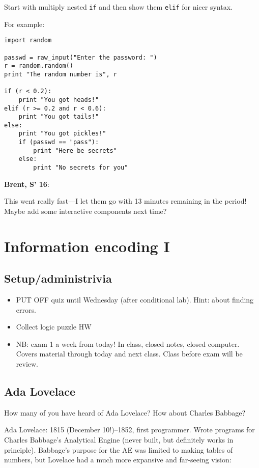\documentclass{article}
\newenvironment{reflect}[1]
{
  \begin{lrbox}{\reflectbox}
    \begin{minipage}[t]{\textwidth}
      \textbf{#1}:
}{
    \end{minipage}
  \end{lrbox}
  \fbox{\usebox{\reflectbox}}
}
\begin{document}
Start with multiply nested {\tt if} and then show them {\tt elif} for
nicer syntax.

For example:
\begin{verbatim}
import random

passwd = raw_input("Enter the password: ")
r = random.random()
print "The random number is", r

if (r < 0.2):
    print "You got heads!"
elif (r >= 0.2 and r < 0.6):
    print "You got tails!"
else:
    print "You got pickles!"
    if (passwd == "pass"):
        print "Here be secrets"
    else:
        print "No secrets for you"
\end{verbatim}

\begin{reflect}{Brent, S' 16}
  This went really fast---I let them go with 13 minutes remaining in
  the period!  Maybe add some interactive components next time?
\end{reflect}


\newpage

\section{Information encoding I}

\subsection*{Setup/administrivia}

\begin{itemize}
\item PUT OFF quiz until Wednesday (after conditional lab).  Hint:
  about finding errors.
\item Collect logic puzzle HW
\item NB: exam 1 a week from today!  In class, closed notes, closed
  computer.  Covers material through today and next class. Class
  before exam will be review.
\end{itemize}

\subsection*{Ada Lovelace}

How many of you have heard of Ada Lovelace?  How about Charles
Babbage?

Ada Lovelace: 1815 (December 10!)--1852, first programmer.  Wrote
programs for Charles Babbage's Analytical Engine (never built, but
definitely works in principle).  Babbage's purpose for the AE was
limited to making tables of numbers, but Lovelace had a much more
expansive and far-seeing vision:
\end{document}
